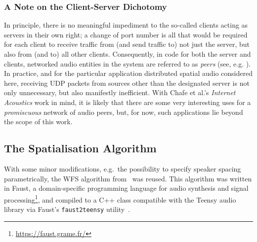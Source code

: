 \subsubsection{A Note on the Client-Server Dichotomy}\label{sss:client-server}

In principle, there is no meaningful impediment to the so-called
clients acting as servers in their own right; a change of port number is all
that would be required for each client to receive traffic from (and send
traffic to) not just the server, but also from (and to) all other clients.
Consequently, in code for both the server and clients, networked audio entities
in the system are referred to as \textit{peers} (see, e.g.
).
In practice, and for the particular application
\textemdash{} distributed spatial audio \textemdash{}
considered here, receiving UDP packets from sources other than the designated
server is not only unnecessary, but also manifestly inefficient.
With Chafe et al.'s \textit{Internet Acoustics} work in mind, it is likely that
there are some very interesting uses for a \textit{promiscuous} network
of audio peers, but, for now, such applications lie beyond the scope of this
work.


\subsection{The Spatialisation Algorithm}\label{subsec:spatialisation-algorithm}

With some minor modifications, e.g.\ the possibility to specify speaker spacing
parametrically, the WFS algorithm
from~\citep{rushton_microcontroller-based_2023} was reused.
This algorithm was written in Faust, a domain-specific programming language
for audio synthesis and signal processing\footnote{
    \url{https://faust.grame.fr/}
}, and compiled to a C++ class compatible with the Teensy audio library via
Faust's \texttt{faust2teensy} utility~\citep{michon_real_2019}.

